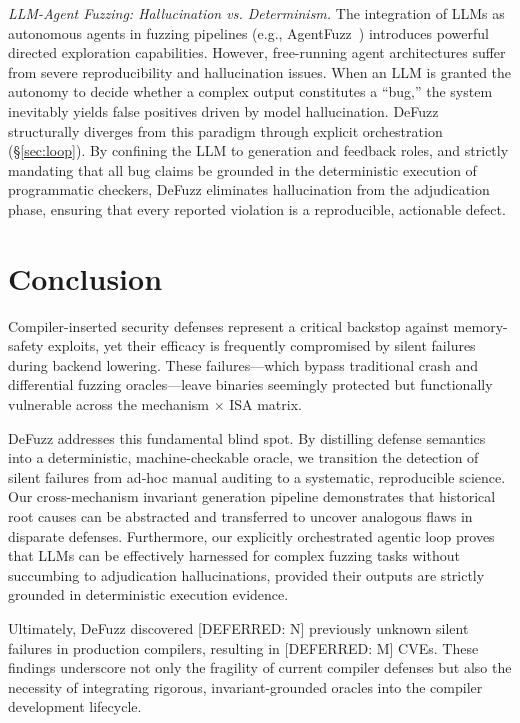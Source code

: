 \documentclass[conference]{IEEEtran}
\begin{document}
\emph{LLM-Agent Fuzzing: Hallucination vs. Determinism.}
The integration of LLMs as autonomous agents in fuzzing pipelines (e.g., AgentFuzz~\cite{liu2025agentfuzz}) introduces powerful directed exploration capabilities. However, free-running agent architectures suffer from severe reproducibility and hallucination issues. When an LLM is granted the autonomy to decide whether a complex output constitutes a ``bug,'' the system inevitably yields false positives driven by model hallucination. DeFuzz structurally diverges from this paradigm through explicit orchestration (\S\ref{sec:loop}). By confining the LLM to generation and feedback roles, and strictly mandating that all bug claims be grounded in the deterministic execution of programmatic checkers, DeFuzz eliminates hallucination from the adjudication phase, ensuring that every reported violation is a reproducible, actionable defect.

\section{Conclusion}\label{sec:concl}
Compiler-inserted security defenses represent a critical backstop against memory-safety exploits, yet their efficacy is frequently compromised by silent failures during backend lowering. These failures---which bypass traditional crash and differential fuzzing oracles---leave binaries seemingly protected but functionally vulnerable across the mechanism $\times$ ISA matrix.

DeFuzz addresses this fundamental blind spot. By distilling defense semantics into a deterministic, machine-checkable oracle, we transition the detection of silent failures from ad-hoc manual auditing to a systematic, reproducible science. Our cross-mechanism invariant generation pipeline demonstrates that historical root causes can be abstracted and transferred to uncover analogous flaws in disparate defenses. Furthermore, our explicitly orchestrated agentic loop proves that LLMs can be effectively harnessed for complex fuzzing tasks without succumbing to adjudication hallucinations, provided their outputs are strictly grounded in deterministic execution evidence.

Ultimately, DeFuzz discovered [DEFERRED: N] previously unknown silent failures in production compilers, resulting in [DEFERRED: M] CVEs. These findings underscore not only the fragility of current compiler defenses but also the necessity of integrating rigorous, invariant-grounded oracles into the compiler development lifecycle.



\end{document}
